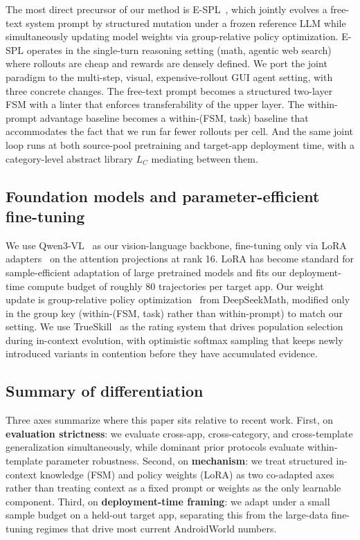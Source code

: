 The most direct precursor of our method is E-SPL~\citep{zhang2026espl}, which jointly evolves a free-text system prompt by structured mutation under a frozen reference LLM while simultaneously updating model weights via group-relative policy optimization. E-SPL operates in the single-turn reasoning setting (math, agentic web search) where rollouts are cheap and rewards are densely defined. We port the joint paradigm to the multi-step, visual, expensive-rollout GUI agent setting, with three concrete changes. The free-text prompt becomes a structured two-layer FSM with a linter that enforces transferability of the upper layer. The within-prompt advantage baseline becomes a within-(FSM, task) baseline that accommodates the fact that we run far fewer rollouts per cell. And the same joint loop runs at both source-pool pretraining and target-app deployment time, with a category-level abstract library $L_C$ mediating between them.

\subsection{Foundation models and parameter-efficient fine-tuning}

We use Qwen3-VL~\citep{qwen3vl2025} as our vision-language backbone, fine-tuning only via LoRA adapters~\citep{hu2021lora} on the attention projections at rank 16. LoRA has become standard for sample-efficient adaptation of large pretrained models and fits our deployment-time compute budget of roughly 80 trajectories per target app. Our weight update is group-relative policy optimization~\citep{shao2024deepseekmath} from DeepSeekMath, modified only in the group key (within-(FSM, task) rather than within-prompt) to match our setting. We use TrueSkill~\citep{herbrich2007trueskill} as the rating system that drives population selection during in-context evolution, with optimistic softmax sampling that keeps newly introduced variants in contention before they have accumulated evidence.

\subsection{Summary of differentiation}

Three axes summarize where this paper sits relative to recent work. First, on \textbf{evaluation strictness}: we evaluate cross-app, cross-category, and cross-template generalization simultaneously, while dominant prior protocols evaluate within-template parameter robustness. Second, on \textbf{mechanism}: we treat structured in-context knowledge (FSM) and policy weights (LoRA) as two co-adapted axes rather than treating context as a fixed prompt or weights as the only learnable component. Third, on \textbf{deployment-time framing}: we adapt under a small sample budget on a held-out target app, separating this from the large-data fine-tuning regimes that drive most current AndroidWorld numbers.
